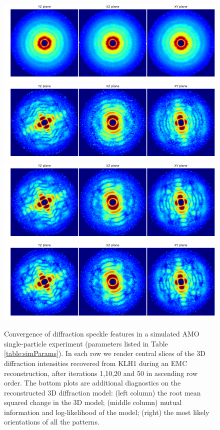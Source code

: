 \documentclass[]{iucr}              %
\begin{document}
\begin{figure}
\caption{Convergence of diffraction speckle features in a simulated AMO single-particle experiment (parameters listed in Table \ref{table:simParams}). In each row we render central slices of the 3D diffraction intensities recovered from KLH1 during an EMC reconstruction, after iterations 1,10,20 and 50 in ascending row order. The bottom plots are additional diagnostics on the reconstructed 3D diffraction model: (left column) the root mean squared change in the 3D model; (middle column) mutual information and log-likelihood of the model; (right) the most likely orientations of all the patterns.}
\includegraphics[height=0.15\textheight]{figures/amo_low_intens_001.png} 
\includegraphics[height=0.15\textheight]{figures/amo_low_intens_010.png}
\includegraphics[height=0.15\textheight]{figures/amo_low_intens_020.png} 
\includegraphics[height=0.15\textheight]{figures/amo_low_intens_050.png} \label{fig:amo_low_intens}

\end{figure}
\end{document}
